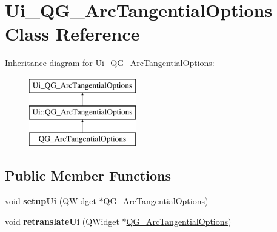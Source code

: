 \hypertarget{classUi__QG__ArcTangentialOptions}{\section{Ui\-\_\-\-Q\-G\-\_\-\-Arc\-Tangential\-Options Class Reference}
\label{classUi__QG__ArcTangentialOptions}
}
Inheritance diagram for Ui\-\_\-\-Q\-G\-\_\-\-Arc\-Tangential\-Options\-:\begin{figure}[H]
\begin{center}
\leavevmode
\includegraphics[height=3.000000cm]{classUi__QG__ArcTangentialOptions}
\end{center}
\end{figure}
\subsection*{Public Member Functions}
\begin{DoxyCompactItemize}
\item 
\hypertarget{classUi__QG__ArcTangentialOptions_ae8a4e7576513aa0265bf0b854ef60190}{void {\bfseries setup\-Ui} (Q\-Widget $\ast$\hyperlink{classQG__ArcTangentialOptions}{Q\-G\-\_\-\-Arc\-Tangential\-Options})}\label{classUi__QG__ArcTangentialOptions_ae8a4e7576513aa0265bf0b854ef60190}

\item 
\hypertarget{classUi__QG__ArcTangentialOptions_a175bf4ff012a3c6830acc55fd3b38a69}{void {\bfseries retranslate\-Ui} (Q\-Widget $\ast$\hyperlink{classQG__ArcTangentialOptions}{Q\-G\-\_\-\-Arc\-Tangential\-Options})}\label{classUi__QG__ArcTangentialOptions_a175bf4ff012a3c6830acc55fd3b38a69}

\end{DoxyCompactItemize}
